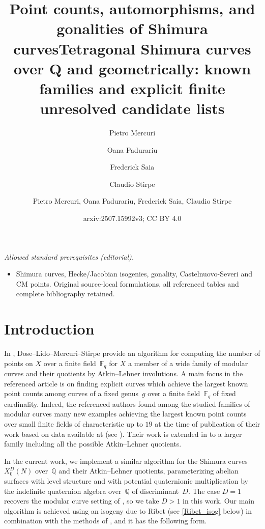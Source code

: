 \documentclass[11pt,reqno]{amsart}
\title{Point counts, automorphisms, and gonalities of Shimura curves}
\author{\sc Pietro Mercuri}
\author{\sc Oana Padurariu}
\author{\sc Frederick Saia}
\author{\sc Claudio Stirpe}
\title{Tetragonal Shimura curves over Q and geometrically: known families and explicit finite unresolved candidate lists}
\author{Pietro Mercuri, Oana Padurariu, Frederick Saia, Claudio Stirpe}
\date{arxiv:2507.15992v3; CC BY 4.0}
\newcommand{\F}{\mathbb{F}}
\newcommand{\Q}{\mathbb{Q}}
\theoremstyle{definition}
\begin{document}
\maketitle
\noindent\textit{Allowed standard prerequisites (editorial).}\begin{itemize}
\item Shimura curves, Hecke/Jacobian isogenies, gonality, Castelnuovo-Severi and CM points. Original source-local formulations, all referenced tables and complete bibliography retained.
\end{itemize}\medskip
\section{Introduction}\label{section: introduction}

In \cite{DLMS}, Dose--Lido--Mercuri--Stirpe provide an algorithm for computing the number of points on $X$ over a finite field~$\F_q$ for $X$ a member of a wide family of modular curves and their quotients by Atkin--Lehner involutions. A main focus in the referenced article is on finding explicit curves which achieve the largest known point counts among curves of a fixed genus~$g$ over a finite field~$\F_q$ of fixed cardinality. Indeed, the referenced authors found among the studied families of modular curves many new examples achieving the largest known point counts over small finite fields of characteristic up to $19$ at the time of publication of their work based on data available at \cite{ManyPoints} (see \cite[\S 6]{DLMS}). Their work is extended in \cite{DLMS26} to a larger family including all the possible Atkin--Lehner quotients.

In the current work, we implement a similar algorithm for the Shimura curves $X_0^D(N)$ over~$\Q$ and their Atkin--Lehner quotients, parameterizing abelian surfaces with level structure and with potential quaternionic multiplication by the indefinite quaternion algebra over~$\Q$ of discriminant~$D$. The case $D=1$ recovers the modular curve setting of \cite{DLMS}, so we take $D>1$ in this work. Our main algorithm is achieved using an isogeny due to Ribet (see \cref{Ribet_isog} below) in combination with the methods of \cite{DLMS}, and it has the following form.
\end{document}
